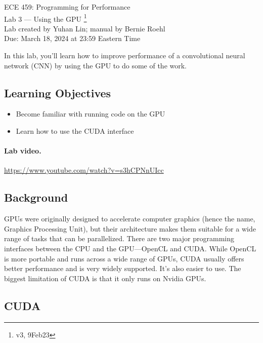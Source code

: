 



\begin{center}
{\Large ECE 459: Programming for Performance}\\
{\Large Lab 3 --- Using the GPU \footnote{v3, 9Feb23}}\\[1em]
Lab created by Yuhan Lin; manual by Bernie Roehl\\
Due: March 18, 2024 at 23:59 Eastern Time
\end{center}

In this lab, you'll learn how to improve performance of a convolutional neural network (CNN) by using the GPU to do some of the work.


\subsection*{Learning Objectives}

\begin{itemize}[noitemsep]
	\item Become familiar with running code on the GPU

	\item Learn how to use the CUDA interface
\end{itemize}

\paragraph{Lab video.} \url{https://www.youtube.com/watch?v=s3hCPNnUIcc}

\subsection*{Background}

GPUs were originally designed to accelerate computer graphics (hence the name, Graphics Processing Unit), but their architecture makes them suitable for a wide range of tasks that can be parallelized. There are two major programming interfaces between the CPU and the GPU---OpenCL and CUDA. While OpenCL is more portable and runs across a wide range of GPUs, CUDA usually offers better performance and is very widely supported. It's also easier to use. The biggest limitation of CUDA is that it only runs on Nvidia GPUs.

\subsection*{CUDA}


